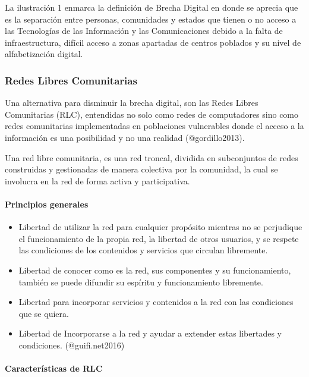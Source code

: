 \documentclass[]{article}
\let\oldparagraph\paragraph
\renewcommand{\paragraph}[1]{\oldparagraph{#1}\mbox{}}
\begin{document}
La ilustración 1 enmarca la definición de Brecha Digital en donde se
aprecia que es la separación entre personas, comunidades y estados que
tienen o no acceso a las Tecnologías de las Información y las
Comunicaciones debido a la falta de infraestructura, difícil acceso a
zonas apartadas de centros poblados y su nivel de alfabetización
digital.

\subsubsection{Redes Libres
Comunitarias}\label{redes-libres-comunitarias}

Una alternativa para disminuir la brecha digital, son las Redes Libres
Comunitarias (RLC), entendidas no solo como redes de computadores sino
como redes comunitarias implementadas en poblaciones vulnerables donde
el acceso a la información es una posibilidad y no una realidad
(@gordillo2013).

Una red libre comunitaria, es una red troncal, dividida en subconjuntos
de redes construidas y gestionadas de manera colectiva por la comunidad,
la cual se involucra en la red de forma activa y participativa.

\paragraph{Principios generales}\label{principios-generales}

\begin{itemize}
\item
  Libertad de utilizar la red para cualquier propósito mientras no se
  perjudique el funcionamiento de la propia red, la libertad de otros
  usuarios, y se respete las condiciones de los contenidos y servicios
  que circulan libremente.~
\item
  Libertad de conocer como es la red, sus componentes y su
  funcionamiento, también se puede difundir su espíritu y funcionamiento
  libremente.
\item
  Libertad para incorporar servicios y contenidos a la red con las
  condiciones que se quiera.
\item
  Libertad de Incorporarse a la red y ayudar a extender estas libertades
  y condiciones. (@guifi.net2016)~
\end{itemize}

\paragraph{Características de RLC}\label{caracteruxedsticas-de-rlc}
\end{document}
